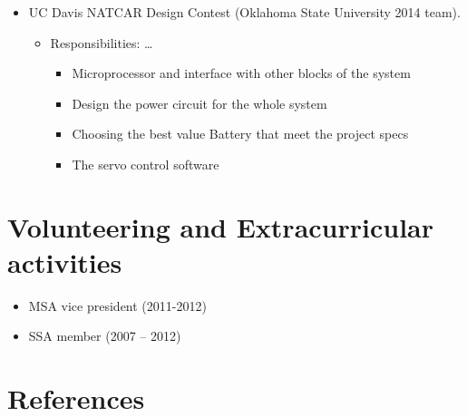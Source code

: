 \documentclass[letterpaper,
		10pt]{article}
\begin{document}
\begin{itemize}
	\item UC Davis NATCAR Design Contest (Oklahoma State University 2014 team).
	\begin{itemize}
		\item Responsibilities: \dots{}
			\begin{itemize}
				\item Microprocessor and interface with other blocks of the system
				\item Design the power circuit for the whole system
				\item Choosing the best value Battery that meet the project specs
				\item The servo control software
			\end{itemize}
	\end{itemize}
\end{itemize}

\section{Volunteering and Extracurricular activities}
\begin{itemize}
	\item MSA vice president (2011-2012)
	\item SSA member (2007 – 2012)
\end{itemize}
\section{References}
\end{document}
